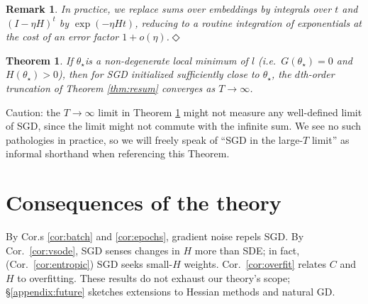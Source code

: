 \documentclass[anon,12pt]{colt2021} %
\newtheorem{thm}{Theorem}
\newtheorem{rmk}{Remark}
\newcommand{\mend}{\hfill $\Diamond$}
\begin{document}
     
            \begin{rmk} \label{rmk:integrate}
                \emph{In practice, we replace sums over embeddings by
                integrals over $t$ and $(I-\eta H)^t$ by $\exp(- \eta H t)$,
                reducing to a routine integration of exponentials at the cost
                of an error factor $1 + o(\eta)$.}\mend
            \end{rmk}

     
            \begin{thm} \label{thm:converge}
                If $\theta_\star$is a non-degenerate local minimum of $l$
                (i.e.\ $G(\theta_\star)=0$ and $H(\theta_\star) > 0$), then for
                SGD initialized sufficiently close to $\theta_\star$, the
                $d$th-order truncation of Theorem \ref{thm:resum} converges as
                $T\to \infty$.
            \end{thm}
            \par\noindent
            Caution: the $T\to \infty$ limit in Theorem \ref{thm:converge}
            might not measure any well-defined limit of SGD, since the limit
            might not commute with the infinite sum.  We see no such
            pathologies in practice, so we will freely speak of ``SGD in the
            large-$T$ limit'' as informal shorthand when referencing this
            Theorem.

    \section{Consequences of the theory}\label{sect:consequences}

        By Cor.s \ref{cor:batch} and \ref{cor:epochs}, gradient noise repels SGD.
        By Cor.\ \ref{cor:vsode}, SGD senses changes in $H$ more than
            SDE; in fact, (Cor.\ \ref{cor:entropic}) SGD seeks small-$H$
            weights.
        Cor.\ \ref{cor:overfit} relates
            $C$ and $H$ to overfitting.  These
            results do not exhaust our theory's scope;
            \S\ref{appendix:future} sketches 
            extensions to Hessian methods and natural GD.
\end{document}
